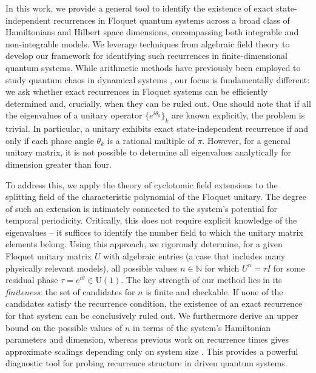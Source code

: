 \documentclass[a4paper,onecolumn,accepted=2026-04-08,10pt]{quantumarticle}
\theoremstyle{definition}
\begin{document}
In this work, we provide a general tool to identify the existence of exact state-independent recurrences in Floquet quantum systems across a broad class of Hamiltonians and Hilbert space dimensions, encompassing both integrable and non-integrable models. We leverage techniques from algebraic field theory to develop our framework for identifying such recurrences in finite-dimensional quantum systems.
While arithmetic methods have previously been employed to study quantum chaos in dynamical systems \cite{jens_aqc_1993, bogomolny_arithmetical_1997, marklof_arithmetic_2006}, our focus is fundamentally different: we ask whether exact recurrences in Floquet systems can be efficiently determined and, crucially, when they can be ruled out. One should note that if all the eigenvalues of a unitary operator $\{e^{i\theta_k}\}_k$ are known explicitly, the problem is trivial.  In particular, a unitary exhibits exact state-independent recurrence if and only if each phase angle $\theta_k$ is a rational multiple of $\pi$. However, for a general unitary matrix, it is not possible to determine all eigenvalues analytically for dimension greater than four.

To address this, we apply the theory of cyclotomic field extensions to the splitting field \cite{dummit_foote_abstract_2003} of the characteristic polynomial of the Floquet unitary. 
The degree of such an extension is intimately connected to the system’s potential for temporal periodicity. Critically, this does not require explicit knowledge of the eigenvalues -- it suffices to identify the number field to which the unitary matrix elements belong.
Using this approach, we rigorously determine, for a given Floquet unitary matrix $U$ with algebraic entries (a case that includes many physically relevant models), all possible values $n \in \mathbb{N}$ for which $U^n = \tau I$ for some residual phase $\tau = e^{i\theta} \in \mathrm{U}(1)$. The key strength of our method lies in its \textit{finiteness}: the set of candidates for $n$ is finite and checkable. If none of the candidates satisfy the recurrence condition, the existence of an exact recurrence for that system can be conclusively ruled out.  We furthermore derive an upper bound on the possible values of $n$ in terms of the system's Hamiltonian parameters and dimension, whereas previous work on recurrence times gives approximate scalings depending only on system size \cite{gimeno_upper_2017,suskind_complexity_2018, freedman_quantumrecurrent_2024,levesque_rec_time_2025,ropotenko_the_2025}.
This provides a powerful diagnostic tool for probing recurrence structure in driven quantum systems.
\end{document}
